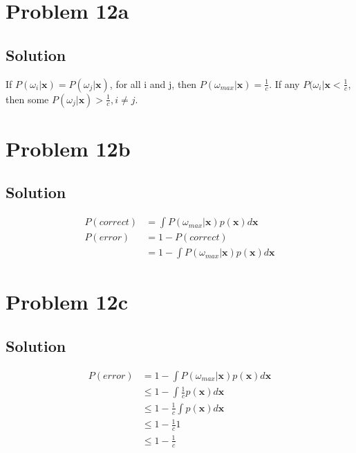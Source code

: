 \documentclass{IEEEtran}
\begin{document}
\newpage

\section{Problem 12a}
\subsection{Solution}
If \(P(\omega_i|\textbf{x}) = P(\omega_j|\textbf{x})\), for all i and j, then \(P(\omega_{max}|\textbf{x}) = \frac{1}{c}\).
If any \(P(\omega_i|\textbf{x} < \frac{1}{c}\), then some \(P(\omega_j|\textbf{x}) > \frac{1}{c}, i \ne j\).

\newpage

\section{Problem 12b}
\subsection{Solution}
\begin{align*}
    P(correct) &= \int P(\omega_{max}|\textbf{x})p(\textbf{x})d\textbf{x} \\
    P(error) &= 1 - P(correct) \\
    &= 1 - \int P(\omega_{max}|\textbf{x})p(\textbf{x})d\textbf{x}
\end{align*}

\newpage

\section{Problem 12c}
\subsection{Solution}
\begin{align*}
    P(error) &= 1 - \int P(\omega_{max}|\textbf{x})p(\textbf{x})d\textbf{x} \\
    &\le 1 - \int \frac{1}{c} p(\textbf{x})d\textbf{x} \\
    &\le 1 - \frac{1}{c} \int p(\textbf{x})d\textbf{x} \\
    &\le 1 - \frac{1}{c} 1 \\
    &\le 1 - \frac{1}{c}
\end{align*}
\end{document}
